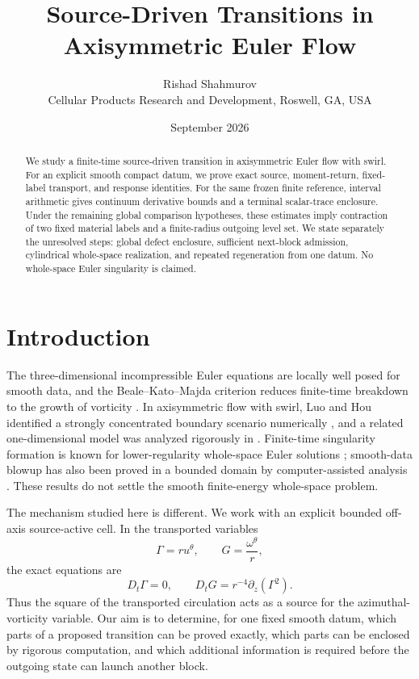 \documentclass[11pt]{article}
\title{\textbf{Source-Driven Transitions in Axisymmetric Euler Flow}}
\author{Rishad Shahmurov\\\small Cellular Products Research and Development, Roswell, GA, USA}
\date{September 2026}
\theoremstyle{definition}\newtheorem{definition}[theorem]{Definition}\newtheorem{problem}[theorem]{Problem}
\theoremstyle{remark}\newtheorem{remark}[theorem]{Remark}
\begin{document}
\maketitle
\begin{abstract}
We study a finite-time source-driven transition in axisymmetric Euler flow with swirl.  For an explicit smooth compact datum, we prove exact source, moment-return, fixed-label transport, and response identities.  For the same frozen finite reference, interval arithmetic gives continuum derivative bounds and a terminal scalar-trace enclosure.  Under the remaining global comparison hypotheses, these estimates imply contraction of two fixed material labels and a finite-radius outgoing level set.  We state separately the unresolved steps: global defect enclosure, sufficient next-block admission, cylindrical whole-space realization, and repeated regeneration from one datum.  No whole-space Euler singularity is claimed.
\end{abstract}

\section{Introduction}
The three-dimensional incompressible Euler equations are locally well posed for smooth data, and the Beale--Kato--Majda criterion reduces finite-time breakdown to the growth of vorticity \cite{BKM1984}.  In axisymmetric flow with swirl, Luo and Hou identified a strongly concentrated boundary scenario numerically \cite{LuoHouPNAS2014,LuoHouMMS2014}, and a related one-dimensional model was analyzed rigorously in \cite{ChoiHouKiselevLuoSverakYao2017}.  Finite-time singularity formation is known for lower-regularity whole-space Euler solutions \cite{Elgindi2021}; smooth-data blowup has also been proved in a bounded domain by computer-assisted analysis \cite{ChenHou2025}.  These results do not settle the smooth finite-energy whole-space problem.

The mechanism studied here is different.  We work with an explicit bounded off-axis source-active cell.  In the transported variables
\[
\Gamma=ru^\theta,\qquad G=\frac{\omega^\theta}{r},
\]
the exact equations are
\[
D_t\Gamma=0,\qquad D_tG=r^{-4}\partial_z(\Gamma^2).
\]
Thus the square of the transported circulation acts as a source for the azimuthal-vorticity variable.  Our aim is to determine, for one fixed smooth datum, which parts of a proposed transition can be proved exactly, which parts can be enclosed by rigorous computation, and which additional information is required before the outgoing state can launch another block.
\end{document}
